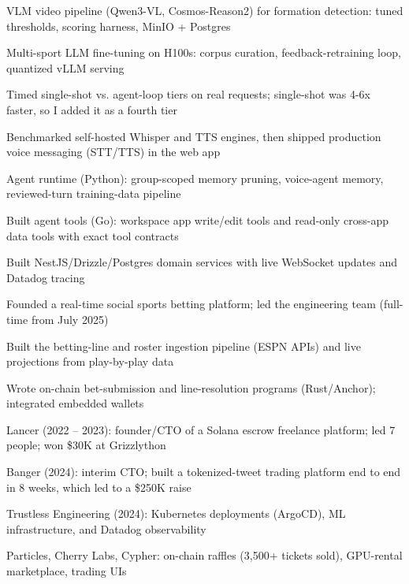 \documentclass[print]{jack-resume}
\begin{document}
\begin{tightemize}
    \item VLM video pipeline (Qwen3-VL, Cosmos-Reason2) for formation detection: tuned thresholds, scoring harness, MinIO + Postgres
    \item Multi-sport LLM fine-tuning on H100s: corpus curation, feedback-retraining loop, quantized vLLM serving
    \item Timed single-shot vs. agent-loop tiers on real requests; single-shot was 4-6x faster, so I added it as a fourth tier
    \item Benchmarked self-hosted Whisper and TTS engines, then shipped production voice messaging (STT/TTS) in the web app
    \item Agent runtime (Python): group-scoped memory pruning, voice-agent memory, reviewed-turn training-data pipeline
    \item Built agent tools (Go): workspace app write/edit tools and read-only cross-app data tools with exact tool contracts
\end{tightemize}
\sectionsep

\begin{tightemize}
    \item Built NestJS/Drizzle/Postgres domain services with live WebSocket updates and Datadog tracing
    \item Founded a real-time social sports betting platform; led the engineering team (full-time from July 2025)
    \item Built the betting-line and roster ingestion pipeline (ESPN APIs) and live projections from play-by-play data
    \item Wrote on-chain bet-submission and line-resolution programs (Rust/Anchor); integrated embedded wallets
\end{tightemize}
\sectionsep

\begin{tightemize}
    \item Lancer (2022 – 2023): founder/CTO of a Solana escrow freelance platform; led 7 people; won \$30K at Grizzlython
    \item Banger (2024): interim CTO; built a tokenized-tweet trading platform end to end in 8 weeks, which led to a \$250K raise
    \item Trustless Engineering (2024): Kubernetes deployments (ArgoCD), ML infrastructure, and Datadog observability
    \item Particles, Cherry Labs, Cypher: on-chain raffles (3,500+ tickets sold), GPU-rental marketplace, trading UIs
\end{tightemize}
\sectionsep
\end{document}
